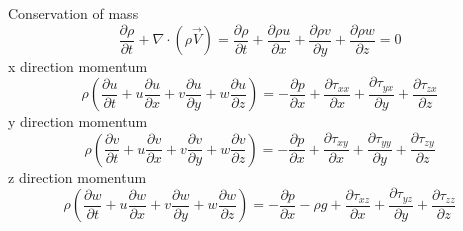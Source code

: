 \documentclass[class=report, crop=false, 12pt,a4paper]{standalone}
\begin{document}
Conservation of mass
\begin{equation}
  \frac{\partial \rho}{\partial t} + \nabla \cdot (\rho \overrightarrow{V}) = \frac{\partial \rho}{\partial t} + \frac{\partial \rho u}{\partial x} + \frac{\partial \rho v}{\partial y} + \frac{\partial \rho w}{\partial z} = 0
\end{equation}
x direction momentum
\begin{equation}
  \rho \left( \frac{\partial u}{\partial t} + u \frac{\partial u}{\partial x} + v \frac{\partial u}{\partial y} + w \frac{\partial u}{\partial z} \right) = -\frac{\partial p}{\partial x} + \frac{\partial \tau_{xx}}{\partial x} + \frac{\partial \tau_{yx}}{\partial y} + \frac{\partial \tau_{zx}}{\partial z}
\end{equation}
y direction momentum
\begin{equation}
  \rho \left( \frac{\partial v}{\partial t} + u \frac{\partial v}{\partial x} + v \frac{\partial v}{\partial y} + w \frac{\partial v}{\partial z} \right) = -\frac{\partial p}{\partial x} + \frac{\partial \tau_{xy}}{\partial x} + \frac{\partial \tau_{yy}}{\partial y} + \frac{\partial \tau_{zy}}{\partial z}
\end{equation}
z direction momentum
\begin{equation}
  \rho \left( \frac{\partial w}{\partial t} + u \frac{\partial w}{\partial x} + v \frac{\partial w}{\partial y} + w \frac{\partial w}{\partial z} \right) = -\frac{\partial p}{\partial x} -\rho g + \frac{\partial \tau_{xz}}{\partial x} + \frac{\partial \tau_{yz}}{\partial y} + \frac{\partial \tau_{zz}}{\partial z}
\end{equation}
\end{document}
